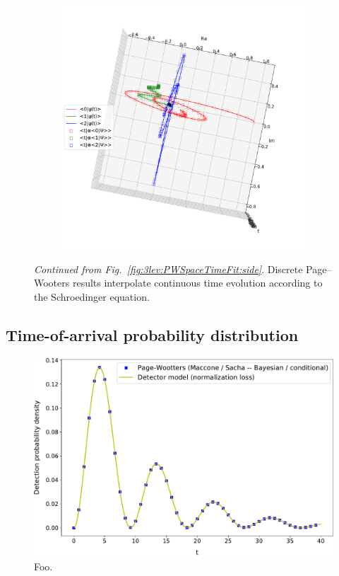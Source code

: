 \begin{figure}[h]\ContinuedFloat
  \begin{subfigure}{\textwidth}
      \centering
      \includegraphics[width=\textwidth]{img/3ldetect/PWSpaceTimeFit_top.pdf}
      \label{fig:3lev:PWSpaceTimeFit:top}
  \end{subfigure}
  \caption{
    \textit{Continued from Fig.~\ref{fig:3lev:PWSpaceTimeFit:side}}.
    Discrete Page--Wooters results
    interpolate continuous
    time evolution according to the Schroedinger equation.
  }
  \label{fig:3lev:PWSpaceTimeFit}
\end{figure}

\subsection{Time-of-arrival probability distribution}

\begin{figure}[h]
  \centering
  \includegraphics[width=\textwidth]{img/3ldetect/conditionalProbFit.pdf}
  \caption{Foo.}
\end{figure}